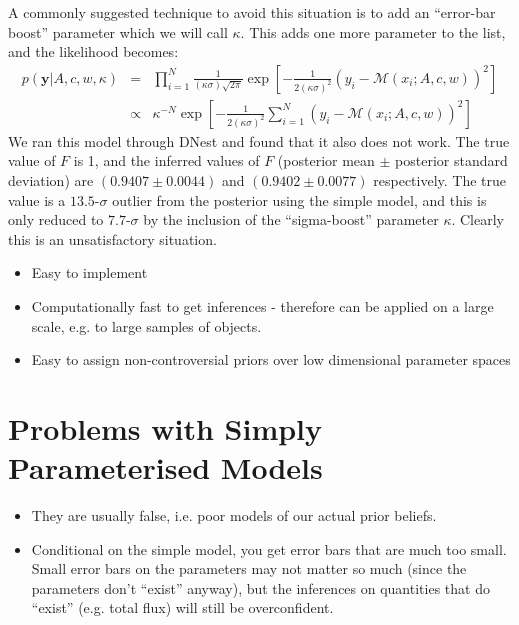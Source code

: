 \documentclass[letterpaper, 11pt]{article}
\newcommand{\yy}{\mathbf{y}}
\begin{document}
A commonly suggested technique \citep[e.g.][]{gregory} to avoid this situation
is to add an ``error-bar boost'' parameter which we will call $\kappa$.
This adds one more parameter to the list, and the likelihood becomes:
\begin{eqnarray}
p(\yy|A, c, w, \kappa) &=& \prod_{i=1}^N
\frac{1}{(\kappa\sigma)\sqrt{2\pi}}
\exp
\left[
-\frac{1}{2(\kappa\sigma)^2}\left(y_i - \mathcal{M}(x_i; A, c, w)\right)^2
\right] \\
&\propto& \kappa^{-N}\exp\left[-\frac{1}{2(\kappa\sigma)^2}\sum_{i=1}^N\left(y_i - \mathcal{M}(x_i; A, c, w)\right)^2\right]
\end{eqnarray}
We ran this model through DNest and found that it also does not work. The
true value of $F$ is 1, and the inferred values of $F$ (posterior mean
$\pm$ posterior standard deviation) are
$(0.9407 \pm 0.0044)$ and $(0.9402 \pm 0.0077)$
respectively. The true value is a $13.5$-$\sigma$ outlier from the posterior
using the simple model, and this is only reduced to $7.7$-$\sigma$ by the
inclusion of the ``sigma-boost'' parameter $\kappa$. Clearly this is an
unsatisfactory situation.

\begin{itemize}
\item Easy to implement \\
\item Computationally fast to get inferences - therefore can be applied on a large scale, e.g. to large samples of objects. \\
\item Easy to assign non-controversial priors over low dimensional parameter spaces \\
\end{itemize}

\section{Problems with Simply Parameterised Models}
\begin{itemize}
\item They are usually false, i.e. poor models of our actual prior beliefs. \\
\item Conditional on the simple model, you get error bars that are much too small. Small error bars on the parameters may not matter so much (since the parameters don't ``exist'' anyway), but the inferences on quantities that do ``exist'' (e.g. total flux) will still be overconfident. \\
\end{itemize}
\end{document}
